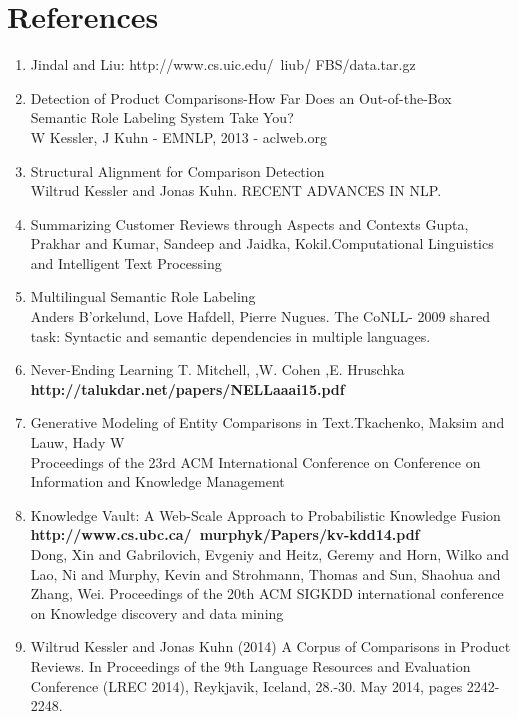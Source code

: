 \documentclass[12pt]{article}
\begin{document}
\section{References}
\begin{enumerate}
\item Jindal and Liu: http://www.cs.uic.edu/~liub/
FBS/data.tar.gz \\

\item Detection of Product Comparisons-How Far Does an Out-of-the-Box Semantic Role Labeling System Take You?\\
W Kessler, J Kuhn - EMNLP, 2013 - aclweb.org \\

\item Structural Alignment for Comparison Detection \\
Wiltrud Kessler and Jonas Kuhn. RECENT ADVANCES IN NLP.

\item Summarizing Customer Reviews through Aspects and Contexts
Gupta, Prakhar and Kumar, Sandeep and Jaidka, Kokil.Computational Linguistics and Intelligent Text Processing
\item Multilingual Semantic Role Labeling\\
Anders B'orkelund, Love Hafdell, Pierre Nugues. The CoNLL-
2009 shared task: Syntactic and semantic dependencies
in multiple languages.
\item Never-Ending Learning T. Mitchell, 
,W. Cohen
,E. Hruschka\\
\textbf{http://talukdar.net/papers/NELLaaai15.pdf}

\item Generative Modeling of Entity Comparisons in Text.Tkachenko, Maksim and Lauw, Hady W\\
Proceedings of the 23rd ACM International Conference on Conference on Information and Knowledge Management

\item Knowledge Vault: A Web-Scale Approach to
Probabilistic Knowledge Fusion\\\textbf{http://www.cs.ubc.ca/~murphyk/Papers/kv-kdd14.pdf}\\
Dong, Xin and Gabrilovich, Evgeniy and Heitz, Geremy and Horn, Wilko and Lao, Ni and Murphy, Kevin and Strohmann, Thomas and Sun, Shaohua and Zhang, Wei.
Proceedings of the 20th ACM SIGKDD international conference on Knowledge discovery and data mining

\item Wiltrud Kessler and Jonas Kuhn (2014)
A Corpus of Comparisons in Product Reviews.
In Proceedings of the 9th Language Resources and Evaluation Conference (LREC 2014), Reykjavik, Iceland, 28.-30. May 2014, pages 2242-2248.

\end{enumerate}
\end{document}
